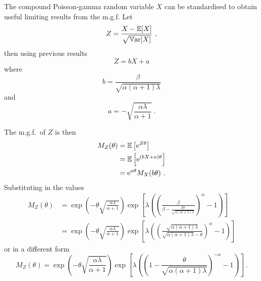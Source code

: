 The compound Poisson-gamma random variable $X$ can be standardised to obtain useful limiting results from the m.g.f. Let
\begin{equation}
  Z = \frac{X-\operatorname{\mathbb{E}}[X]}{\sqrt{\operatorname{\mathbb{V}ar}[X]}}
  \ ,
\end{equation}
then using previous results
\begin{equation}
  Z = bX+a
\end{equation}
where
\begin{equation}
  b = \frac{\beta}{\sqrt{\alpha(\alpha+1)\lambda}}
\end{equation}
and
\begin{equation}
  a = -\sqrt{\frac{\alpha\lambda}{\alpha+1}}
  \ .
\end{equation}

The m.g.f.~of $Z$ is then
\begin{align}
  M_Z(\theta)&=\operatorname{\mathbb{E}}\left[\mathrm{e}^{Z\theta}\right]
  \\
  &=\operatorname{\mathbb{E}}\left[\mathrm{e}^{(bX+a)\theta}\right]
  \\
  &=\mathrm{e}^{a\theta}M_X(b\theta)
  \ .
\end{align}
Substituting in the values
\begin{align}
  M_Z(\theta)&=
  \exp\left(
      -\theta\sqrt{\frac{\alpha\lambda}{\alpha+1}}
    \right)
  \exp\left[
    \lambda
    \left(
      \left(
        \frac{\beta}{\beta-\frac{\beta\theta}{\sqrt{\alpha(\alpha+1)\lambda}}}
      \right)^\alpha
      -1
    \right)
  \right]
  \\
  &=
  \exp\left(
      -\theta\sqrt{\frac{\alpha\lambda}{\alpha+1}}
    \right)
  \exp\left[
    \lambda
    \left(
      \left(
        \frac{\sqrt{\alpha(\alpha+1)\lambda}}{\sqrt{\alpha(\alpha+1)\lambda}-\theta}
      \right)^\alpha
      -1
    \right)
  \right]
\end{align}
or in a different form
\begin{equation}
	M_Z(\theta)=
	\exp\left(
	    -\theta\sqrt{\frac{\alpha\lambda}{\alpha+1}}
    \right)
	\exp\left[
		\lambda
		\left(
			\left(
				1-\frac{\theta}{\sqrt{\alpha(\alpha+1)\lambda}}	
			\right)^{-\alpha}
			-1
		\right)
	\right]
	\ .
\end{equation}

